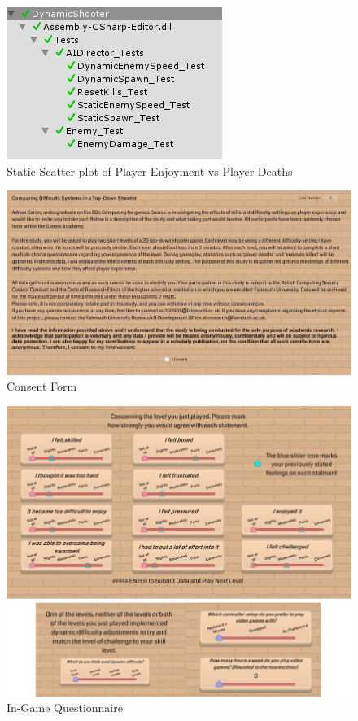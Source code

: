 \documentclass[journal]{IEEEtran}
\begin{document}
\begin{figure}[h]
	\includegraphics[width=1.0\linewidth]{unittests.jpg}
	\caption{Static Scatter plot of Player Enjoyment vs Player Deaths}
	\label{fig::8}
\end{figure}

\begin{figure}[h]
	\includegraphics[width=0.75\linewidth]{consentformingame.jpg}
	\caption{Consent Form}
	\label{fig::9}
\end{figure} 

\begin{figure}[h]
	\includegraphics[width=0.75\linewidth]{questionnaireingame.jpg}
	\caption{In-Game Questionnaire}
	\label{fig::10}
\end{figure} 
\end{document}
